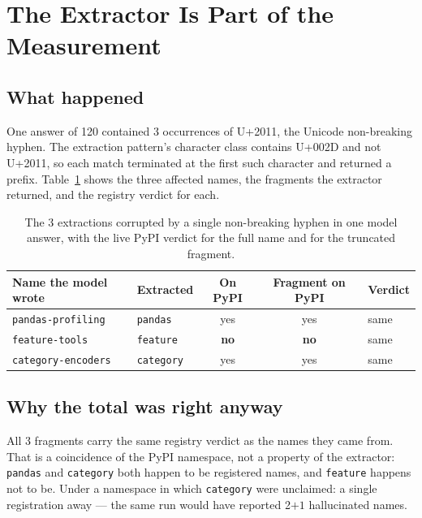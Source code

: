 \documentclass[journal]{IEEEtran}
\theoremstyle{definition}
\newcommand{\Nprompts}{120}
\newcommand{\Nhallcorr}{2}
\newcommand{\Ntrunc}{3}
\newcommand{\Ndashchar}{3}
\newcommand{\Ncoin}{3}
\begin{document}
\section{The Extractor Is Part of the Measurement}
\label{sec:extractor}

\subsection{What happened}

One answer of \Nprompts{} contained \Ndashchar{} occurrences of U+2011, the
Unicode non-breaking hyphen. The extraction pattern's character class contains
U+002D and not U+2011, so each match terminated at the first such character and
returned a prefix. Table~\ref{tab:extractor} shows the three affected names, the
fragments the extractor returned, and the registry verdict for each.

\begin{table}[t]
\caption{The \Ntrunc{} extractions corrupted by a single non-breaking hyphen in
one model answer, with the live PyPI verdict for the full name and for the
truncated fragment.}
\label{tab:extractor}
\centering
\small
\setlength{\tabcolsep}{5pt}
\begin{tabular}{llccl}
\toprule
Name the model wrote & Extracted & On PyPI & Fragment on PyPI & Verdict \\
\midrule
\texttt{pandas-\allowbreak{}profiling} & \texttt{pandas} & yes & yes & same \\
\texttt{feature-tools} & \texttt{feature} & \textbf{no} & \textbf{no} & same \\
\texttt{category-\allowbreak{}encoders} & \texttt{category} & yes & yes & same \\
\bottomrule
\end{tabular}
\end{table}

\subsection{Why the total was right anyway}

All \Ncoin{} fragments carry the same registry verdict as the names they came
from. That is a coincidence of the PyPI namespace, not a property of the
extractor: \texttt{pandas} and \texttt{category} both happen to be registered
names, and \texttt{feature} happens not to be. Under a namespace in which
\texttt{category} were unclaimed: a single registration away --- the same
run would have reported \Nhallcorr{}$+1$ hallucinated names.
\end{document}
